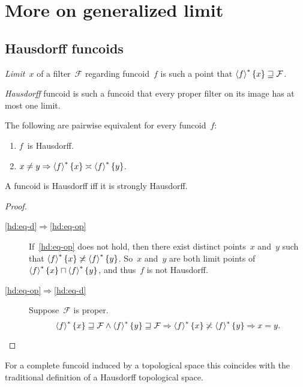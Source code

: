 \chapter{More on generalized limit}

\section{Hausdorff funcoids}

\begin{defn}
\emph{Limit}~$x$ of a filter~$\mathcal{F}$ regarding
funcoid~$f$ is such a point that $\left\langle f\right\rangle ^{\ast}\{x\}\sqsupseteq\mathcal{F}$.
\end{defn}

\begin{defn}
\emph{Hausdorff} funcoid is such a funcoid that every proper
filter on its image has at most one limit.
\end{defn}

\begin{prop}
The following are pairwise equivalent for every funcoid~$f$:
\begin{enumerate}
\item\label{hd:eq-d} $f$~is Hausdorff.
\item\label{hd:eq-op}
$x\ne y\Rightarrow\left\langle f\right\rangle ^{\ast}\{x\}\asymp\left\langle f\right\rangle ^{\ast}\{y\}$.
\end{enumerate}
A funcoid is Hausdorff iff it is strongly Hausdorff.
\end{prop}

\begin{proof}
~
\begin{description}
\item[\ref{hd:eq-d}$\Rightarrow$\ref{hd:eq-op}]
If~\ref{hd:eq-op} does not hold,
then there exist distinct points~$x$ and~$y$ such that
$\left\langle f\right\rangle ^{\ast}\{x\}\not\asymp\left\langle f\right\rangle ^{\ast}\{y\}$.
So~$x$ and~$y$ are both limit points of
$\left\langle f\right\rangle ^{\ast}\{x\}\sqcap\left\langle f\right\rangle ^{\ast}\{y\}$, and thus~$f$ is not
Hausdorff.
\item[\ref{hd:eq-op}$\Rightarrow$\ref{hd:eq-d}]
Suppose~$\mathcal{F}$ is proper.
\[ \left\langle f\right\rangle ^{\ast}\{x\}\sqsupseteq\mathcal{F}\land
\left\langle f\right\rangle ^{\ast}\{y\}\sqsupseteq\mathcal{F}\Rightarrow
\left\langle f\right\rangle ^{\ast}\{x\}\not\asymp\left\langle f\right\rangle ^{\ast}\{y\}\Rightarrow x=y. \]
\end{description}
\end{proof}

\begin{obvious}
For a complete funcoid induced by a topological space this
coincides with the traditional definition of a Hausdorff
topological space.
\end{obvious}

